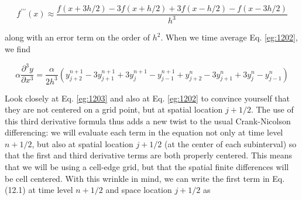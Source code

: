 \documentclass{book}
\theoremstyle{plain}
\theoremstyle{definition}
\numberwithin{exm}{chapter}
\theoremstyle{remark}
\theoremstyle{summary}
\theoremstyle{overview}
\begin{document}
\begin{equation}\label{eq:1202}
f^{\prime \prime \prime}(x) \approx \frac{f(x+3 h / 2)-3 f(x+h / 2)+3 f(x-h / 2)-f(x-3 h / 2)}{h^{3}}
\end{equation}

along with an error term on the order of $h^{2}$. When we time average Eq. \eqref{eg:1202}, we find

\begin{equation}\label{eq:1203}
\alpha \frac{\partial^{3} y}{\partial x^{3}}=\frac{\alpha}{2 h^{3}}\left(y_{j+2}^{n+1}-3 y_{j+1}^{n+1}+3 y_{j}^{n+1}-y_{j-1}^{n+1}+y_{j+2}^{n}-3 y_{j+1}^{n}+3 y_{j}^{n}-y_{j-1}^{n}\right)
\end{equation}

Look closely at Eq. \eqref{eg:1203} and also at Eq. \eqref{eg:1202} to convince yourself that they are not centered on a grid point, but at spatial location $j+1 / 2$. The use of this third derivative formula thus adds a new twist to the usual Crank-Nicolson differencing: we will evaluate each term in the equation not only at time level $n+1 / 2$, but also at spatial location $j+1 / 2$ (at the center of each subinterval) so that the first and third derivative terms are both properly centered. This means that we will be using a cell-edge grid, but that the spatial finite differences will be cell centered.
With this wrinkle in mind, we can write the first term in Eq. (12.1) at time level $n+1 / 2$ and space location $j+1 / 2$ as
\end{document}
